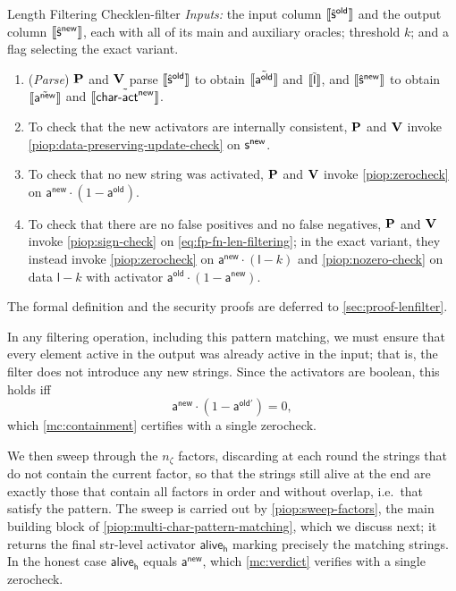 \begin{DefinePIOP}{Length Filtering Check}{len-filter}
  \emph{Inputs:} the input column $\llbracket\hat{\mathsf{s}}^{\mathsf{old}}\rrbracket$ and the output column $\llbracket\hat{\mathsf{s}}^{\mathsf{new}}\rrbracket$, each with all of its main and auxiliary oracles; threshold $k$; and a flag selecting the exact variant.
  \begin{enumerate}[nosep]
    \item (\emph{Parse}) $\bf{P}$ and $\bf{V}$ parse $\llbracket\hat{\mathsf{s}}^{\mathsf{old}}\rrbracket$ to obtain $\llbracket\tilde{\mathsf{a}^{\mathsf{old}}}\rrbracket$ and $\llbracket\tilde{\mathsf{l}}\rrbracket$, and $\llbracket\hat{\mathsf{s}}^{\mathsf{new}}\rrbracket$ to obtain $\llbracket\tilde{\mathsf{a}^{\mathsf{new}}}\rrbracket$ and $\llbracket\tilde{\mathsf{char\text{-}act}^{\mathsf{new}}}\rrbracket$.
    \item To check that the new activators are internally consistent, $\bf{P}$ and $\bf{V}$ invoke \cref{piop:data-preserving-update-check} on $\mathsf{s}^{\mathsf{new}}$.
    \item To check that no new string was activated, $\bf{P}$ and $\bf{V}$ invoke \cref{piop:zerocheck} on $\mathsf{a}^{\mathsf{new}}\cdot(1-\mathsf{a}^{\mathsf{old}})$.
    \item To check that there are no false positives and no false negatives, $\bf{P}$ and $\bf{V}$ invoke \cref{piop:sign-check} on \cref{eq:fp-fn-len-filtering}; in the exact variant, they instead invoke \cref{piop:zerocheck} on $\mathsf{a}^{\mathsf{new}}\cdot(\mathsf{l}-k)$ and \cref{piop:nozero-check} on data $\mathsf{l}-k$ with activator $\mathsf{a}^{\mathsf{old}}\cdot(1-\mathsf{a}^{\mathsf{new}})$.
  \end{enumerate}
\end{DefinePIOP}
The formal definition and the security proofs are deferred to \cref{sec:proof-lenfilter}.

 In any filtering operation, including this pattern matching, we must ensure that every element active in the output was already active in the input; that is, the filter does not introduce any new strings. Since the activators are boolean, this holds iff
\begin{equation}\label{eq:pm-containment}
  \mathsf{a^{new}}\cdot(1-\mathsf{a^{old'}}) = 0,
\end{equation}
which \cref{mc:containment} certifies with a single zerocheck.

 We then sweep through the $n_\zeta$ factors, discarding at each round the strings that do not contain the current factor, so that the strings still alive at the end are exactly those that contain all factors in order and without overlap, i.e.\ that satisfy the pattern. The sweep is carried out by \cref{piop:sweep-factors}, the main building block of \cref{piop:multi-char-pattern-matching}, which we discuss next; it returns the final str-level activator $\mathsf{alive_h}$ marking precisely the matching strings. In the honest case $\mathsf{alive_h}$ equals $\mathsf{a^{new}}$, which \cref{mc:verdict} verifies with a single zerocheck.


